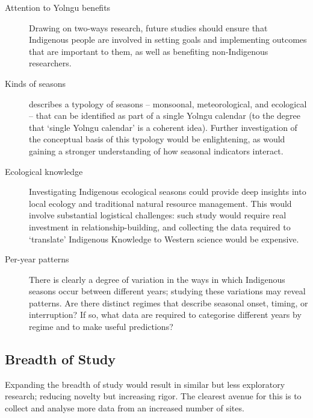 \begin{description}
\item[Attention to Yolngu benefits]
    Drawing on two-ways research, future studies should ensure that Indigenous
    people are involved in setting goals and implementing outcomes that are
    important to them, as well as benefiting non-Indigenous researchers.

\item[Kinds of seasons]
     describes a typology of seasons -- monsoonal,
    meteorological, and ecological -- that can be identified as part of a
    single Yolngu calendar (to the degree that `single Yolngu calendar'
    is a coherent idea).  Further investigation of the conceptual basis of this typology would
    be enlightening, as would gaining a stronger understanding of how
    seasonal indicators interact.

\item[Ecological knowledge]
    Investigating Indigenous ecological seasons could provide deep insights
    into local ecology and traditional natural resource management. This would
    involve substantial logistical challenges:  such study would require real
    investment in relationship-building, and collecting the data
    required to `translate' Indigenous Knowledge to Western science would
    be expensive.

\item[Per-year patterns]
    There is clearly a degree of variation in the ways in which Indigenous seasons occur between
    different years; studying these variations may reveal patterns.  Are there distinct
    regimes that describe seasonal onset, timing, or interruption?  If so, what
    data are required to categorise different years by regime and to make useful predictions?
\end{description}

\subsection{Breadth of Study}
Expanding the breadth of study would result in similar but less exploratory
research; reducing novelty but increasing rigor.  The clearest avenue for
this is to collect and analyse more data from an increased number of sites.

